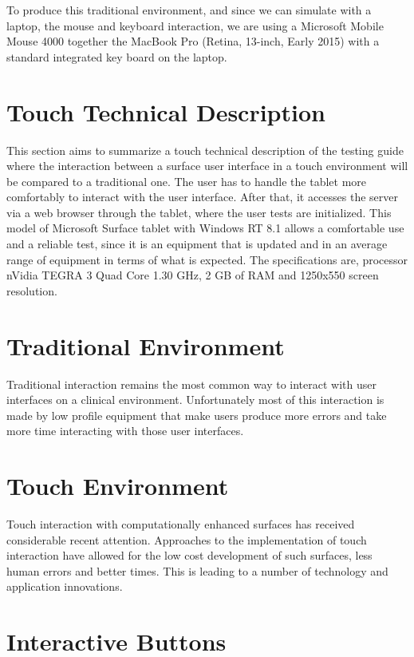 \documentclass{article}
\begin{document}
To produce this traditional environment, and since we can simulate with a laptop, the mouse and keyboard interaction, we are using a Microsoft Mobile Mouse 4000 together the MacBook Pro (Retina, 13-inch, Early 2015) with a standard integrated key board on the laptop.

\section{Touch Technical Description}

This section aims to summarize a touch technical description of the testing guide where the interaction between a surface user interface in a touch environment will be compared to a traditional one. The user has to handle the tablet more comfortably to interact with the user interface. After that, it accesses the server via a web browser through the tablet, where the user tests are initialized. This model of Microsoft Surface tablet with Windows RT 8.1 allows a comfortable use and a reliable test, since it is an equipment that is updated and in an average range of equipment in terms of what is expected. The specifications are, processor nVidia TEGRA 3 Quad Core 1.30 GHz, 2 GB of RAM and 1250x550 screen resolution.

\section{Traditional Environment}

Traditional interaction remains the most common way to interact with user interfaces on a clinical environment. Unfortunately most of this interaction is made by low profile equipment that make users produce more errors and take more time interacting with those user interfaces.

\section{Touch Environment}

Touch interaction with computationally enhanced surfaces
has received considerable recent attention. Approaches
to the implementation of touch interaction  have allowed for the low cost development of such surfaces, less human errors and better times. This is leading to a number of technology and application innovations.

\clearpage

\section{Interactive Buttons}
\end{document}
